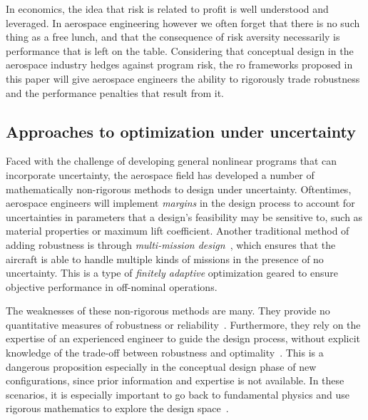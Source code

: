 In economics, the idea that risk is related to profit is well understood and leveraged.
In aerospace engineering however we often forget that there is no such thing as a free lunch,
and that the consequence of risk aversity necessarily is performance that is left on the table.
Considering that conceptual design in the aerospace industry hedges against program risk,
the \gls{ro} frameworks proposed in this paper will
give aerospace engineers the ability to rigorously trade robustness and the performance penalties
that result from it.

\subsection{Approaches to optimization under uncertainty}

Faced with the challenge of developing general nonlinear programs that can incorporate uncertainty,
the aerospace field has developed a number of mathematically non-rigorous methods to
design under uncertainty. Oftentimes, aerospace engineers will implement
\emph{margins} in the design process to account for uncertainties in parameters that a design's feasibility
may be sensitive to, such as material properties or maximum lift coefficient.
Another traditional method of adding robustness is through \emph{multi-mission design}~\cite{York2018},
which ensures that the aircraft is able to handle
multiple kinds of missions in the presence of no uncertainty. This is a type of \emph{finitely
adaptive} optimization geared to ensure objective performance in off-nominal operations.

The weaknesses of these non-rigorous methods are many. They provide no quantitative measures of
robustness or reliability~\cite{Zang2002}. Furthermore, they rely on the expertise of an experienced
engineer to guide the design process, without explicit knowledge of the trade-off between
robustness and optimality~\cite{Yao2011}. This is a dangerous proposition especially in the
conceptual design phase of new configurations, since prior information and expertise is not
available. In these scenarios, it is especially important to go back to fundamental physics
and use rigorous mathematics to explore the design space~\cite{York2018}.

